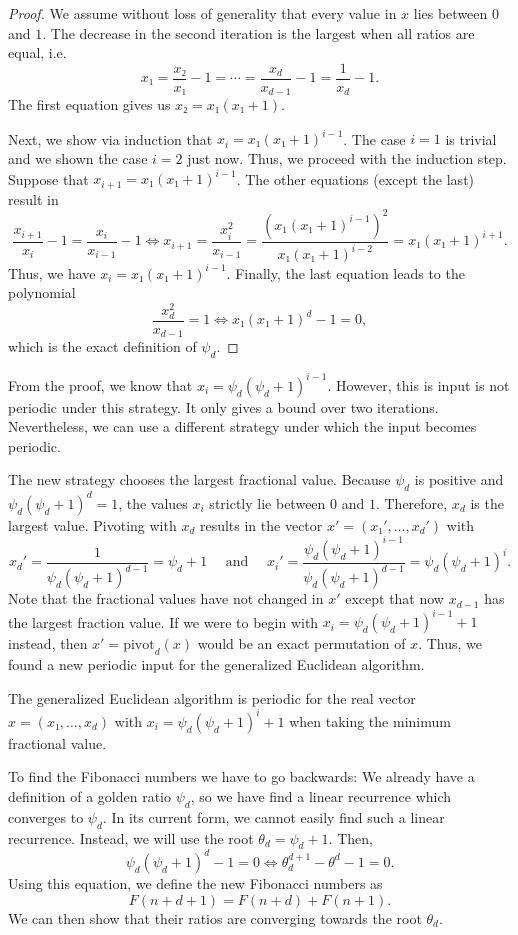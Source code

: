 \begin{proof}
  We assume without loss of generality that every value in $x$
  lies between $0$ and $1$.
  The decrease in the second iteration is the largest
  when all ratios are equal, i.e.
  \[
    x₁ = \frac{x₂}{x₁} - 1 = ⋯ = \frac{x_d}{x_{d-1}} - 1 = \frac{1}{x_d} - 1.
  \]
  The first equation gives us $x₂ = x₁(x₁ + 1)$.

  Next, we show via induction that $x_i = x₁ (x₁ + 1)^{i-1}$.
  The case $i = 1$ is trivial and we shown the case $i = 2$ just now.
  Thus, we proceed with the induction step.
  Suppose that $x_{i+1} = x₁ (x₁ + 1)^{i-1}$.
  The other equations (except the last) result in
  \[
    \frac{x_{i+1}}{x_i} - 1 = \frac{x_i}{x_{i-1}} - 1 \iff
    x_{i+1}
    = \frac{x_i^2}{x_{i-1}}
    = \frac{(x_1 (x₁ + 1)^{i-1})^2}{x₁ (x₁ + 1)^{i-2}}
    = x₁ (x₁ + 1)^{i+1}
    .
  \]
  Thus, we have $x_i = x₁(x₁ + 1)^{i-1}$.
  Finally, the last equation leads to the polynomial
  \[
    \frac{x_d^2}{x_{d-1}} = 1
    \iff
    x₁ (x₁ + 1)^d - 1 = 0,
  \]
  which is the exact definition of $ψ_d$.
\end{proof}

From the proof, we know that $x_i = ψ_d (ψ_d + 1)^{i-1}$.
However, this is input is not periodic under this strategy.
It only gives a bound over two iterations.
Nevertheless, we can use a different strategy under which the input becomes periodic.

The new strategy chooses the largest fractional value.
Because $ψ_d$ is positive and $ψ_d (ψ_d + 1)^d = 1$,
the values $x_i$ strictly lie between $0$ and $1$.
Therefore, $x_d$ is the largest value.
Pivoting with $x_d$ results in the vector $x' = (x₁', …, x_d')$ with
\[
  x_d' = \frac{1}{ψ_d (ψ_d + 1)^{d-1}} = ψ_d + 1
  \quad
  \text{ and }
  \quad
  x_i' = \frac{ψ_d (ψ_d + 1)^{i-1}}{ψ_d (ψ_d + 1)^{d-1}} = ψ_d (ψ_d + 1)^i.
\]
Note that the fractional values have not changed in $x'$
except that now $x_{d-1}$ has the largest fraction value.
If we were to begin with $x_i = ψ_d (ψ_d + 1)^{i-1} + 1$ instead,
then $x' = \mathrm{pivot}_d(x)$ would be an exact permutation of $x$.
Thus, we found a new periodic input for the generalized Euclidean algorithm.

\begin{theorem}
  The generalized Euclidean algorithm is periodic for the real vector $x = (x₁, …, x_d)$
  with $x_i = ψ_d (ψ_d + 1)^i + 1$ when taking the minimum fractional value.
\end{theorem}

To find the Fibonacci numbers we have to go backwards:
We already have a definition of a golden ratio $ψ_d$,
so we have find a linear recurrence which converges to $ψ_d$.
In its current form, we cannot easily find such a linear recurrence.
Instead, we will use the root $θ_d = ψ_d + 1$.
Then,
\[
  ψ_d (ψ_d + 1)^d - 1 = 0
  \iff
  θ_d^{d+1} - θ^d - 1 = 0.
\]
Using this equation, we define the new Fibonacci numbers as
\[
  F(n + d + 1) = F(n + d) + F(n + 1).
\]
We can then show that their ratios are converging towards the root $θ_d$.

